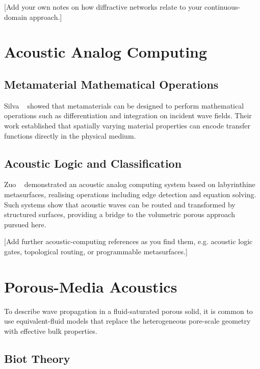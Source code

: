 [Add your own notes on how diffractive networks relate to your continuous-domain approach.]

\section{Acoustic Analog Computing}
\label{sec:acoustic_computing}

\subsection{Metamaterial Mathematical Operations}
\label{subsec:silva_math}

Silva \etal\ \cite{silva2014mathematical} showed that metamaterials can be designed to perform mathematical operations such as differentiation and integration on incident wave fields. Their work established that spatially varying material properties can encode transfer functions directly in the physical medium.

\subsection{Acoustic Logic and Classification}
\label{subsec:zuo_acoustic}

Zuo \etal\ \cite{zuo2018acoustic} demonstrated an acoustic analog computing system based on labyrinthine metasurfaces, realising operations including edge detection and equation solving. Such systems show that acoustic waves can be routed and transformed by structured surfaces, providing a bridge to the volumetric porous approach pursued here.

[Add further acoustic-computing references as you find them, e.g. acoustic logic gates, topological routing, or programmable metasurfaces.]

\section{Porous-Media Acoustics}
\label{sec:porous_acoustics}

To describe wave propagation in a fluid-saturated porous solid, it is common to use equivalent-fluid models that replace the heterogeneous pore-scale geometry with effective bulk properties.

\subsection{Biot Theory}
\label{subsec:biot}

